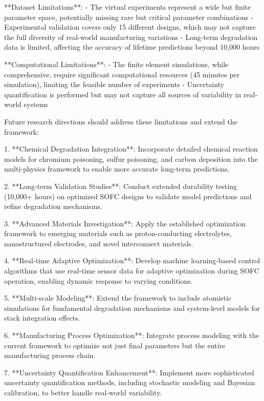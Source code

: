 \documentclass[10pt,conference]{IEEEtran}
\begin{document}
**Dataset Limitations**:
- The virtual experiments represent a wide but finite parameter space, potentially missing rare but critical parameter combinations
- Experimental validation covers only 15 different designs, which may not capture the full diversity of real-world manufacturing variations
- Long-term degradation data is limited, affecting the accuracy of lifetime predictions beyond 10,000 hours

**Computational Limitations**:
- The finite element simulations, while comprehensive, require significant computational resources (45 minutes per simulation), limiting the feasible number of experiments
- Uncertainty quantification is performed but may not capture all sources of variability in real-world systems

Future research directions should address these limitations and extend the framework:

1. **Chemical Degradation Integration**: Incorporate detailed chemical reaction models for chromium poisoning, sulfur poisoning, and carbon deposition into the multi-physics framework to enable more accurate long-term predictions.

2. **Long-term Validation Studies**: Conduct extended durability testing (10,000+ hours) on optimized SOFC designs to validate model predictions and refine degradation mechanisms.

3. **Advanced Materials Investigation**: Apply the established optimization framework to emerging materials such as proton-conducting electrolytes, nanostructured electrodes, and novel interconnect materials.

4. **Real-time Adaptive Optimization**: Develop machine learning-based control algorithms that use real-time sensor data for adaptive optimization during SOFC operation, enabling dynamic response to varying conditions.

5. **Multi-scale Modeling**: Extend the framework to include atomistic simulations for fundamental degradation mechanisms and system-level models for stack integration effects.

6. **Manufacturing Process Optimization**: Integrate process modeling with the current framework to optimize not just final parameters but the entire manufacturing process chain.

7. **Uncertainty Quantification Enhancement**: Implement more sophisticated uncertainty quantification methods, including stochastic modeling and Bayesian calibration, to better handle real-world variability.
\end{document}
